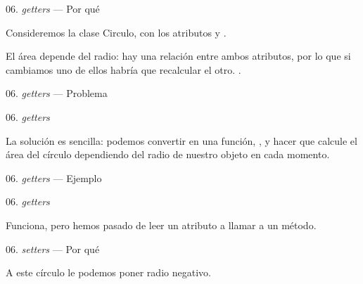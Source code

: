 
\begin{frame}{06. \textit{getters} — Por qué}
  \begin{block}{}
    \small
    \centering
    Consideremos la clase Circulo, con los atributos 
    y .
  \end{block}

  \begin{center}
    El área depende del radio: hay una relación entre ambos atributos,
    por lo que si cambiamos uno de ellos habría que recalcular el
    otro. .
  \end{center}
\end{frame}

\begin{frame}{06. \textit{getters} — Problema}
  \scriptsize
\end{frame}

\begin{frame}{06. \textit{getters}}
  \begin{block}{}
    \centering
    La solución es sencilla: podemos convertir  en una
    función, , y hacer que calcule el área del
    círculo dependiendo del radio de nuestro objeto en cada momento.
  \end{block}
\end{frame}

\begin{frame}{06. \textit{getters} — Ejemplo}
  \scriptsize
\end{frame}

\begin{frame}{06. \textit{getters}}
  \begin{alertblock}{}
    \large
    \centering
    Funciona, pero hemos pasado de leer un atributo a llamar a un
    método.
  \end{alertblock}
\end{frame}

\begin{frame}{06. \textit{setters} — Por qué}
  \begin{block}{}
    \centering
    A este círculo le podemos poner radio negativo.
  \end{block}
\end{frame}

